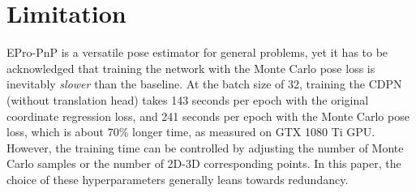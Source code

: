 \documentclass[10pt,twocolumn,letterpaper]{article}
\begin{document}
\begin{table}[h]
    \RawFloats
    \begin{center}
    \end{center}
    \vspace{-1ex}
    \caption{Inference time (sec) of the deformable correspondence network on nuScenes object detection dataset~\cite{nuscenes}. The PnP solver (including the random sampling initialization in Section~\ref{rslm}) works faster (26 ms) with PyTorch v1.8.1, for which the code was originally developed, while the full model works faster (301 ms) with PyTorch v1.10.1.}
    \label{tab:runtime}
\end{table}

\section{Limitation}

EPro-PnP is a versatile pose estimator for general problems, yet it has to be acknowledged that training the network with the Monte Carlo pose loss is inevitably \emph{slower} than the baseline. At the batch size of 32, training the CDPN (without translation head) takes 143 seconds per epoch with the original coordinate regression loss, and 241 seconds per epoch with the Monte Carlo pose loss, which is about 70\% longer time, as measured on GTX 1080 Ti GPU. However, the training time can be controlled by adjusting the number of Monte Carlo samples or the number of 2D-3D corresponding points. In this paper, the choice of these hyperparameters generally leans towards redundancy. 
\end{document}
